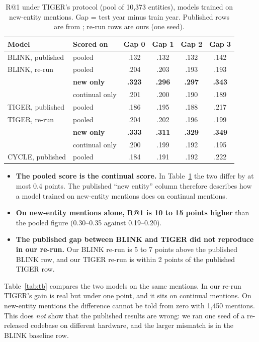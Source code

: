 \documentclass[conference]{IEEEtran}
\begin{document}
\begin{table}[t]
\caption{R@1 under TIGER's protocol (pool of 10,373 entities), models trained on new-entity mentions. Gap = test year minus train year. Published rows are from \cite{tiger,cycle}; re-run rows are ours (one seed).}
\label{tab:c1}
\centering
\footnotesize
\begin{tabular}{llcccc}
\toprule
Model & Scored on & Gap 0 & Gap 1 & Gap 2 & Gap 3 \\
\midrule
BLINK, published & pooled & .132 & .132 & .132 & .142 \\
BLINK, re-run & pooled & .204 & .203 & .193 & .193 \\
 & \textbf{new only} & \textbf{.323} & \textbf{.296} & \textbf{.297} & \textbf{.343} \\
 & continual only & .201 & .200 & .190 & .189 \\
\midrule
TIGER, published & pooled & .186 & .195 & .188 & .217 \\
TIGER, re-run & pooled & .204 & .202 & .196 & .199 \\
 & \textbf{new only} & \textbf{.333} & \textbf{.311} & \textbf{.329} & \textbf{.349} \\
 & continual only & .200 & .199 & .192 & .195 \\
\midrule
CYCLE, published & pooled & .184 & .191 & .192 & .222 \\
\bottomrule
\end{tabular}
\end{table}

\begin{itemize}
\item \textbf{The pooled score is the continual score.} In Table~\ref{tab:c1} the two differ by at
most 0.4 points. The published ``new entity'' column therefore describes how a model trained on
new-entity mentions does on continual mentions.
\item \textbf{On new-entity mentions alone, R@1 is 10 to 15 points higher} than the pooled figure
(0.30--0.35 against 0.19--0.20).
\item \textbf{The published gap between BLINK and TIGER did not reproduce in our re-run.} Our BLINK
re-run is 5 to 7 points above the published BLINK row, and our TIGER re-run is within 2 points of the
published TIGER row.
\end{itemize}

Table~\ref{tab:tb} compares the two models on the same mentions. In our re-run TIGER's gain is real
but under one point, and it sits on continual mentions. On new-entity mentions the difference cannot
be told from zero with 1,450 mentions. This does \emph{not} show that the published results are wrong:
we ran one seed of a re-released codebase on different hardware, and the larger mismatch is in the
BLINK baseline row.
\end{document}
